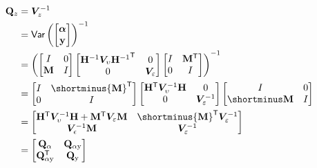\documentclass[notitlepage,a4paper,12pt]{article}
\newcommand{\transpose}[1]{{#1}^{\sf{T}}}
\begin{document}
\begin{align*}
    \mathbf{Q}_z 
    &= 
    \bm{V}^{-1}_z \\
    &= 
    \text{\sf{Var}}\left(
    \begin{bmatrix}
        \boldsymbol{\alpha} \\
        \mathbf{y}
    \end{bmatrix}
    \right)^{-1} \\
    &=  
    \left(
    \begin{bmatrix}
        I & 0 \\
        \mathbf{M} & I
    \end{bmatrix}
    \begin{bmatrix}
        \mathbf{H}^{-1} \bm{V}_{\upsilon} \transpose{\mathbf{H}^{-1}} & 0 \\
        0 & \bm{V}_{\varepsilon}
    \end{bmatrix} 
    \begin{bmatrix}
        I & \transpose{\mathbf{M}} \\
        0 & I
    \end{bmatrix}
    \right)^{-1}\\
    &=
    \begin{bmatrix}
        I & \shortminus\transpose{\mathbf{M}} \\
        0 & I
    \end{bmatrix}
    \begin{bmatrix}
        \transpose{\mathbf{H}} \bm{V}^{-1}_{\upsilon} \mathbf{H} & 0 \\
        0 & \bm{V}^{-1}_{\varepsilon}
    \end{bmatrix} 
    \begin{bmatrix}
        I & 0 \\
        \shortminus\mathbf{M} & I 
    \end{bmatrix} \\
    &=
    \begin{bmatrix}
         \transpose{\mathbf{H}} \bm{V}^{-1}_{\upsilon} \mathbf{H} + \transpose{\mathbf{M}}\bm{V}_{\varepsilon}\mathbf{M}  & \shortminus \transpose{\mathbf{M}} \bm{V}^{-1}_{\varepsilon} \\
         \bm{V}^{-1}_{\epsilon} \mathbf{M} & \bm{V}^{-1}_{\varepsilon}
    \end{bmatrix} \\
    &= 
    \begin{bmatrix}
        \mathbf{Q}_{\alpha} & \mathbf{Q}_{\alpha\text{y}} \\
        \transpose{\mathbf{Q}}_{\alpha \text{y}} & \mathbf{Q}_{\text{y}}  
    \end{bmatrix}
\end{align*}
\end{document}
